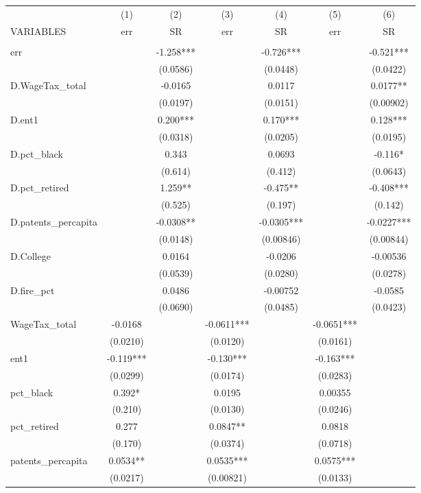 \begin{tabular}{lcccccc} \hline
 & (1) & (2) & (3) & (4) & (5) & (6) \\
VARIABLES & err & SR & err & SR & err & SR \\ \hline
 &  &  &  &  &  &  \\
err &  & -1.258*** &  & -0.726*** &  & -0.521*** \\
 &  & (0.0586) &  & (0.0448) &  & (0.0422) \\
D.WageTax\_total &  & -0.0165 &  & 0.0117 &  & 0.0177** \\
 &  & (0.0197) &  & (0.0151) &  & (0.00902) \\
D.ent1 &  & 0.200*** &  & 0.170*** &  & 0.128*** \\
 &  & (0.0318) &  & (0.0205) &  & (0.0195) \\
D.pct\_black &  & 0.343 &  & 0.0693 &  & -0.116* \\
 &  & (0.614) &  & (0.412) &  & (0.0643) \\
D.pct\_retired &  & 1.259** &  & -0.475** &  & -0.408*** \\
 &  & (0.525) &  & (0.197) &  & (0.142) \\
D.patents\_percapita &  & -0.0308** &  & -0.0305*** &  & -0.0227*** \\
 &  & (0.0148) &  & (0.00846) &  & (0.00844) \\
D.College &  & 0.0164 &  & -0.0206 &  & -0.00536 \\
 &  & (0.0539) &  & (0.0280) &  & (0.0278) \\
D.fire\_pct &  & 0.0486 &  & -0.00752 &  & -0.0585 \\
 &  & (0.0690) &  & (0.0485) &  & (0.0423) \\
WageTax\_total & -0.0168 &  & -0.0611*** &  & -0.0651*** &  \\
 & (0.0210) &  & (0.0120) &  & (0.0161) &  \\
ent1 & -0.119*** &  & -0.130*** &  & -0.163*** &  \\
 & (0.0299) &  & (0.0174) &  & (0.0283) &  \\
pct\_black & 0.392* &  & 0.0195 &  & 0.00355 &  \\
 & (0.210) &  & (0.0130) &  & (0.0246) &  \\
pct\_retired & 0.277 &  & 0.0847** &  & 0.0818 &  \\
 & (0.170) &  & (0.0374) &  & (0.0718) &  \\
patents\_percapita & 0.0534** &  & 0.0535*** &  & 0.0575*** &  \\
 & (0.0217) &  & (0.00821) &  & (0.0133) &  \\

\end{tabular}
